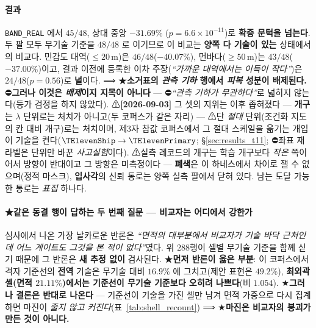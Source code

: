 \documentclass[11pt]{report}
\numberwithin{equation}{chapter}
\numberwithin{figure}{chapter}
\numberwithin{table}{chapter}
\begin{document}
\paragraph{결과}
\texttt{BAND\_REAL} 에서 \textbf{$45/48$}, 상대 중앙 \textbf{$-31.69\%$}
($p = 6.6\times10^{-11}$)로 \textbf{확증 문턱을 넘는다}.
두 팔 모두 무기술 기준을 $48/48$ 로 이기므로 이 비교는 \textbf{양쪽 다 기술이 있는}
상태에서의 비교다. 민감도 대역($\le 20$\,m)은 $46/48$($-40.07\%$), 먼바다($\ge 50$\,m)는
$43/48$($-37.00\%$)이고, 결과 이전에 등록한 이차 주장(\emph{``가까운 대역에서는 이득이
작다''})은 $24/48$($p = 0.56$)로 \textbf{널}이다.
⟹ ★\textbf{소거표의 \emph{관측 기하} 행에서 \emph{피복} 성분이 배제된다.}
⛔\textbf{그러나 이것은 \emph{배제}이지 지목이 아니다} --- ⛔\emph{``관측 기하가
무관하다''}로 넓히지 않는다(등가 검정을 하지 않았다).
⚠\textbf{[2026-09-03]} 그 셋의 지위는 이후 좁혀졌다 --- \textbf{개구}는 $\lambda$ 단위로는 처치가 아니고(두 코퍼스가 같은 자리) --- ⚠단 \emph{절대} 단위(조건화 지도의 칸 대비 개구)로는 처치이며, 제3자 참값 코퍼스에서 그 절대 스케일을 옮기는 개입이 기술을 켠다($\TElevenShip \to \TElevenPrimary$; \S\ref{sec:results_t11}; ⛔좌표 재라벨은 단위만 바꾼 \emph{사고실험}이다). ⚠실측 레코드의 개구는 학습 개구보다 \emph{작은} 쪽이어서 방향이 반대이고 그 방향은 미측정이다 --- \textbf{폐색}은 이 하네스에서 차이로 잴 수 없으며(정적 마스크), \textbf{입사각}의 신뢰 통로는 양쪽 실측 팔에서
닫혀 있다. 남는 도달 가능한 통로는 \emph{표집} 하나다.

\paragraph{★같은 동결 행이 답하는 두 번째 질문 --- 비교자는 어디에서 강한가}
심사에서 나온 가장 날카로운 반론은 \emph{``면적의 대부분에서 비교자가 기술 바닥 근처인데
어느 게이트도 그것을 본 적이 없다''}였다. 위 $288$행이 셸별 무기술 기준을 함께 싣기
때문에 그 반론은 \textbf{새 추정 없이} 검사된다.
★\textbf{먼저 반론이 옳은 부분}: 이 코퍼스에서 격자 기준선의 \textbf{전역} 기술은
무기술 대비 $\mathbf{16.9\%}$ 에 그치고(제안 표현은 $49.2\%$), \textbf{최외곽 셸(면적
$21.11\%$)에서는 기준선이 무기술 기준보다 오히려 나쁘다}(비 $\mathbf{1.054}$).
★\textbf{그러나 결론은 반대로 나온다} --- 기준선이 기술을 가진 셀만 남겨 면적 가중으로
다시 집계하면 마진이 \emph{줄지 않고 커진다}(표~\ref{tab:shell_recount})
⟹ ★\textbf{마진은 비교자의 붕괴가 만든 것이 아니다.}
\end{document}
